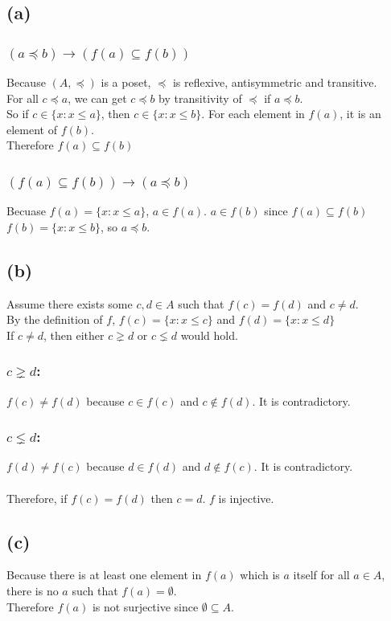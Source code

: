 \documentclass{article} %
\begin{document}
\subsection*{(a)}
\subsubsection*{$(a \preceq b) \to (f(a) \subseteq f(b))$}
Because $(A, \preceq)$ is a poset, $\preceq$ is reflexive, antisymmetric and transitive.\\
For all $c \preceq a$, we can get $c \preceq b$ by transitivity of $\preceq$ if $a \preceq b$.\\
So if $c \in \{x:x \leq a\}$, then $c \in \{x:x \leq b\}$. For each element in $f(a)$, it is an element of $f(b)$. \\
Therefore $f(a) \subseteq f(b)$

\subsubsection*{$ (f(a) \subseteq f(b)) \to (a \preceq b)$}
Becuase $f(a) = \{x:x \leq a\}$, $a \in f(a)$. $a\in f(b)$ since $f(a)\subseteq f(b)$\\
$f(b) = \{x:x \leq b\}$, so $a \preceq b$.

\subsection*{(b)}
Assume there exists some $c, d \in A$ such that $f(c) = f(d)$ and $c \neq d$.\\
By the definition of $f$, $f(c) = \{x:x\leq c\}$ and $f(d) = \{x:x \leq d\}$\\
If $c \neq d$, then either $c \gneq d$ or $c \lneq d$ would hold.\\
\subsubsection*{$c \gneq d$:}
$f(c) \neq f(d)$ because $c\in f(c)$ and $c \notin f(d)$. It is contradictory.
\subsubsection*{$c \lneq d$:}
$f(d) \neq f(c)$ because $d \in f(d)$ and $d \notin f(c)$. It is contradictory.\\
\\
Therefore, if $f(c)=f(d)$ then $c=d$. $f$ is injective.

\subsection*{(c)}
Because there is at least one element in $f(a)$ which is $a$ itself for all $a \in A$, there is no $a$ such that $f(a) = \emptyset$.\\
Therefore $f(a)$ is not surjective since $\emptyset \subseteq A$.
\end{document}
